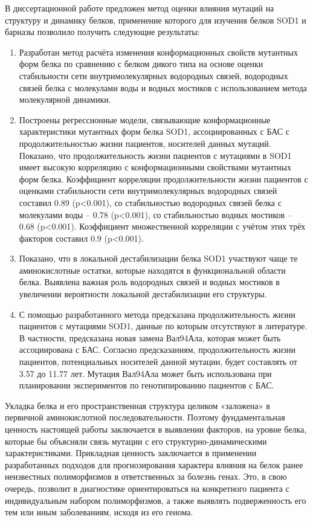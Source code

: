{\novelty}
В диссертационной работе предложен метод оценки влияния мутаций на структуру и динамику белков, применение которого для изучения белков SOD1 и барназы позволило получить следующие результаты:
\begin{enumerate}
  \item Разработан метод расчёта изменения конформационных свойств мутантных форм белка по сравнению с белком дикого типа на основе оценки стабильности сети внутримолекулярных водородных связей, водородных связей белка с молекулами воды и водных мостиков с использованием метода молекулярной динамики.
  \item Построены регрессионные модели, связывающие конформационные характеристики мутантных форм белка SOD1, ассоциированных с БАС с продолжительностью жизни пациентов, носителей данных мутаций. Показано, что продолжительность жизни пациентов с мутациями в SOD1 имеет высокую корреляцию с конформационными свойствами мутантных форм белка. Коэффициент корреляции продолжительности жизни пациентов с оценками стабильности сети внутримолекулярных водородных связей составил 0.89 (p<0.001), со стабильностью водородных связей белка с молекулами воды -- 0.78 (p<0.001), со стабильностью водных мостиков -- 0.68 (p<0.001). Коэффициент множественной корреляции с учётом этих трёх факторов составил 0.9 (p<0.001).
  \item Показано, что в локальной дестабилизации белка SOD1 участвуют чаще те аминокислотные остатки, которые находятся в функциональной области белка. Выявлена важная роль водородных связей и водных мостиков в увеличении вероятности локальной дестабилизации его структуры.
  \item С помощью разработанного метода предсказана продолжительность жизни пациентов с мутациями SOD1, данные по которым отсутствуют в литературе. В частности, предсказана новая замена Вал94Ала,  которая может быть ассоциирована с БАС. Согласно предсказаниям, продолжительность жизни пациентов, потенциальных носителей данной мутации, будет составлять от 3.57 до 11.77 лет. Мутация Вал94Ала  может быть использована при планировании экспериментов по генотипированию пациентов с БАС.
\end{enumerate}

{\influence} Укладка белка и его пространственная структура целиком «заложена» в первичной аминокислотной последовательности. Поэтому фундаментальная ценность настоящей работы заключается в выявлении факторов, на уровне белка, которые бы объясняли связь мутации с его структурно-динамическими характеристиками. Прикладная ценность заключается в применении разработанных подходов для прогнозирования характера влияния на белок ранее неизвестных полиморфизмов в ответственных за болезнь генах. Это, в свою очередь, позволит в диагностике ориентироваться на конкретного пациента с индивидуальным набором полиморфизмов, а также выявлять подверженность его тем или иным заболеваниям, исходя из его генома. 

